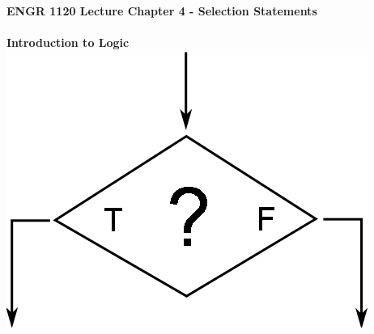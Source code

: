 \documentclass[11pt]{article}
\newcommand{\NUM}{4 }
\begin{document}
\textbf{ \LARGE ENGR 1120 Lecture Chapter \NUM - Selection Statements\\\\ Introduction to Logic} \\
	
\includegraphics[scale=0.3]{lecture1_fig1.png}\\\\
\end{document}
